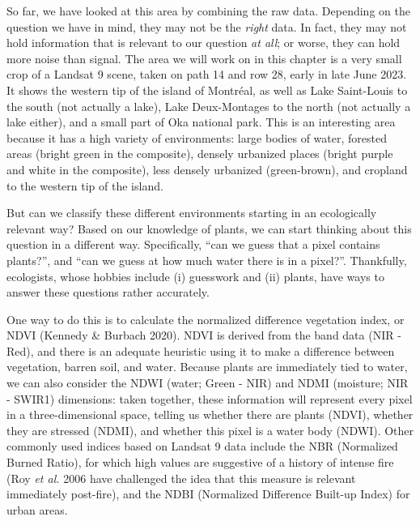 \documentclass[
  letterpaper,
]{scrbook}
\begin{document}

So far, we have looked at this area by combining the raw data. Depending
on the question we have in mind, they may not be the \emph{right} data.
In fact, they may not hold information that is relevant to our question
\emph{at all}; or worse, they can hold more noise than signal. The area
we will work on in this chapter is a very small crop of a Landsat 9
scene, taken on path 14 and row 28, early in late June 2023. It shows
the western tip of the island of Montréal, as well as Lake Saint-Louis
to the south (not actually a lake), Lake Deux-Montages to the north (not
actually a lake either), and a small part of Oka national park. This is
an interesting area because it has a high variety of environments: large
bodies of water, forested areas (bright green in the composite), densely
urbanized places (bright purple and white in the composite), less
densely urbanized (green-brown), and cropland to the western tip of the
island.

But can we classify these different environments starting in an
ecologically relevant way? Based on our knowledge of plants, we can
start thinking about this question in a different way. Specifically,
``can we guess that a pixel contains plants?'', and ``can we guess at
how much water there is in a pixel?''. Thankfully, ecologists, whose
hobbies include (i) guesswork and (ii) plants, have ways to answer these
questions rather accurately.

One way to do this is to calculate the normalized difference vegetation
index, or NDVI (Kennedy \& Burbach 2020). NDVI is derived from the band
data (NIR - Red), and there is an adequate heuristic using it to make a
difference between vegetation, barren soil, and water. Because plants
are immediately tied to water, we can also consider the NDWI (water;
Green - NIR) and NDMI (moisture; NIR - SWIR1) dimensions: taken
together, these information will represent every pixel in a
three-dimensional space, telling us whether there are plants (NDVI),
whether they are stressed (NDMI), and whether this pixel is a water body
(NDWI). Other commonly used indices based on Landsat 9 data include the
NBR (Normalized Burned Ratio), for which high values are suggestive of a
history of intense fire (Roy \emph{et al.} 2006 have challenged the idea
that this measure is relevant immediately post-fire), and the NDBI
(Normalized Difference Built-up Index) for urban areas.
\end{document}
